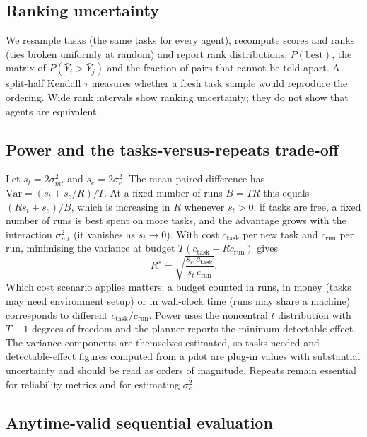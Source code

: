 \subsection{Ranking uncertainty}
We resample tasks (the same tasks for every agent), recompute scores and ranks (ties broken uniformly at random) and report rank distributions, $P(\text{best})$, the matrix of $P(\bar Y_i>\bar Y_j)$ and the fraction of pairs that cannot be told apart. A split-half Kendall $\tau$ measures whether a fresh task sample would reproduce the ordering. Wide rank intervals show ranking uncertainty; they do not show that agents are equivalent.

\subsection{Power and the tasks-versus-repeats trade-off}\label{sec:power}
Let $s_t=2\sigma^2_{mt}$ and $s_e=2\sigma^2_e$. The mean paired difference has $\mathrm{Var}=(s_t+s_e/R)/T$. At a fixed number of runs $B=TR$ this equals $(Rs_t+s_e)/B$, which is increasing in $R$ whenever $s_t>0$: if tasks are free, a fixed number of runs is best spent on more tasks, and the advantage grows with the interaction $\sigma^2_{mt}$ (it vanishes as $s_t\to0$). With cost $c_\text{task}$ per new task and $c_\text{run}$ per run, minimising the variance at budget $T(c_\text{task}+Rc_\text{run})$ gives
\begin{equation}
R^\star=\sqrt{\frac{s_e\,c_\text{task}}{s_t\,c_\text{run}}}.
\end{equation}
Which cost scenario applies matters: a budget counted in runs, in money (tasks may need environment setup) or in wall-clock time (runs may share a machine) corresponds to different $c_\text{task}/c_\text{run}$. Power uses the noncentral $t$ distribution with $T-1$ degrees of freedom and the planner reports the minimum detectable effect. The variance components are themselves estimated, so tasks-needed and detectable-effect figures computed from a pilot are plug-in values with substantial uncertainty and should be read as orders of magnitude. Repeats remain essential for reliability metrics and for estimating $\sigma^2_e$.

\subsection{Anytime-valid sequential evaluation}
